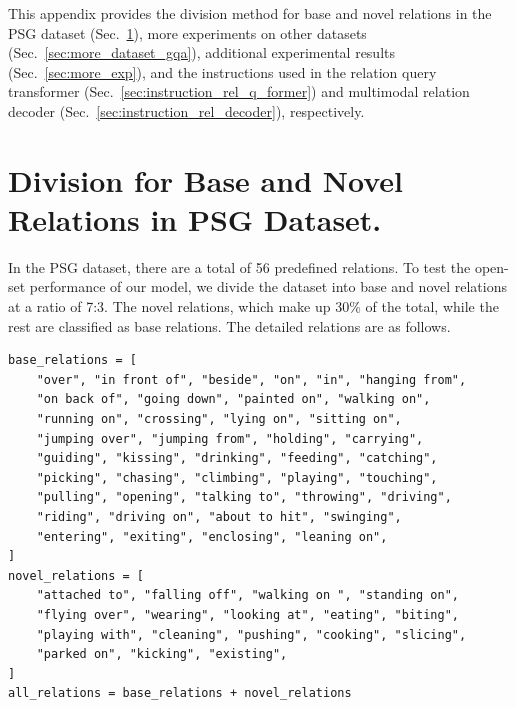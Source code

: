 \noindent This appendix provides the division method for base and novel relations in the PSG dataset (Sec.~\ref{sec:division}), more experiments on other datasets (Sec.~\ref{sec:more_dataset_gqa}), additional experimental results (Sec.~\ref{sec:more_exp}), and the instructions used in the relation query transformer (Sec.~\ref{sec:instruction_rel_q_former}) and multimodal relation decoder (Sec.~\ref{sec:instruction_rel_decoder}), respectively.



\section{Division for Base and Novel Relations in PSG Dataset.}
\label{sec:division}
In the PSG dataset, there are a total of 56 predefined relations.
To test the open-set performance of our model, we divide the dataset into base and novel relations at a ratio of 7:3.
The novel relations, which make up 30\% of the total, while the rest are classified as base relations.
The detailed relations are as follows.
\begin{lstlisting}[style=openpsgappendix]
base_relations = [
    "over", "in front of", "beside", "on", "in", "hanging from",
    "on back of", "going down", "painted on", "walking on",
    "running on", "crossing", "lying on", "sitting on",
    "jumping over", "jumping from", "holding", "carrying",
    "guiding", "kissing", "drinking", "feeding", "catching",
    "picking", "chasing", "climbing", "playing", "touching",
    "pulling", "opening", "talking to", "throwing", "driving",
    "riding", "driving on", "about to hit", "swinging",
    "entering", "exiting", "enclosing", "leaning on",
]
novel_relations = [
    "attached to", "falling off", "walking on ", "standing on",
    "flying over", "wearing", "looking at", "eating", "biting",
    "playing with", "cleaning", "pushing", "cooking", "slicing",
    "parked on", "kicking", "existing",
]
all_relations = base_relations + novel_relations
\end{lstlisting}


